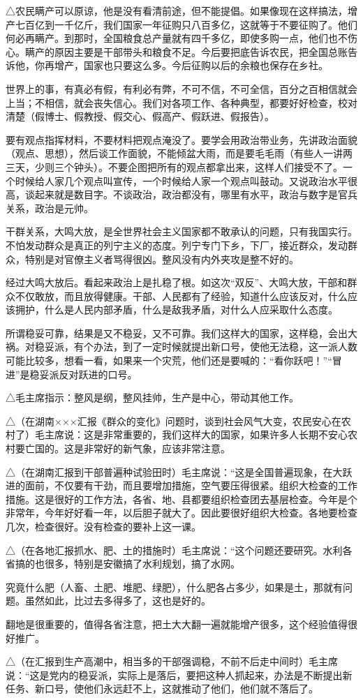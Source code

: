 △农民瞒产可以原谅，他是没有看清前途，但不能提倡。如果像现在这样搞法，增产七百亿到一千亿斤，我们国家一年征购只八百多亿，这就等于不要征购了。他们何必再瞒产。到那时，全国粮食总产量就有四千多亿，即使多购一点，他们也不伤心。瞒产的原因主要是干部带头和粮食不足。今后要把底告诉农民，把全国总账告诉他，你再增产，国家也只要这么多。今后征购以后的余粮也保存在乡社。

世界上的事，有真必有假，有利必有弊，不可不信，不可全信，百分之百相信就会上当；不相信，就会丧失信心。我们对各项工作、各种典型，都要好好检查，校对清楚（假博士、假教授、假交心、假高产、假跃进、假报告）。

要有观点指挥材料，不要材料把观点淹没了。要学会用政治带业务，先讲政治面貌（观点、思想），然后谈工作面貌，不能倾盆大雨，而是要毛毛雨（有些人一讲两三天，少则三个钟头）。不要企图把所有的观点都拿出来，这样人们接受不了。一个时候给人家几个观点叫宣传，一个时候给人家一个观点叫鼓动。又说政治水平很高，谈起来就是数目字。不谈政治，政治都没有，哪里有水平，政治与数字是官兵关系，政治是元帅。

干群关系，大鸣大放，是全世界社会主义国家都不敢承认的问题，只有我国实行。不怕发动群众是真正的列宁主义的态度。列宁专门下乡，下厂，接近群众，发动群众，特别是对官僚主义者骂得很凶。整风没有内外夹攻是整不好的。

经过大鸣大放后。看起来政治上是扎稳了根。如这次“双反”、大鸣大放，干部和群众不仅敢放，而且放得健康。干部、人民都有了经验，知道什么应该反对，什么应该拥护，什么是人民内部矛盾，什么是敌我矛盾，对什么人应采取什么态度。

所谓稳妥可靠，结果是又不稳妥，又不可靠。我们这样大的国家，这样稳，会出大祸。对稳妥派，有个办法，到了一定时候就提出新口号，使他无法稳，这一派人数可能比较多，想看一看，如果来一个灾荒，他们还是要喊的：“看你跃吧！”“冒进”是稳妥派反对跃进的口号。

△毛主席指示：整风是纲，整风挂帅，生产是中心，带动其他工作。

△（在湖南×××汇报《群众的变化》问题时，谈到社会风气大变，农民安心在农村了）毛主席说：这是非常重要的，我们这样大的国家，如果许多人长期不安心农村要亡国的。这是非常好的新气象，应该非常注意。

△（在湖南汇报到干部普遍种试验田时）毛主席说：“这是全国普遍现象，在大跃进的面前，不仅要有干劲，而且要增加措施，空气要压得很紧。组织大检查的工作措施。这是很好的工作方法，各省、地、县都要组织检查团去基层检查。今年是个非常年，今年好好看一年，以后胆子就大了。因此要很好组织大检查。各地要检查几次，检查很好。没有检查的要补上这一课。

△（在各地汇报抓水、肥、土的措施时）毛主席说：“这个问题还要研究。水利各省搞的也很多，特别是安徽搞了水利规划，搞了水网。

究竟什么肥（人畜、土肥、堆肥、绿肥），什么肥各占多少，如果是土，那就有问题。虽然如此，比过去多得多了，这也是好的。

翻地是很重要的，值得各省注意，把土大大翻一遍就能增产很多，这个经验值得很好推广。

△（在汇报到生产高潮中，相当多的干部强调稳，不前不后走中间时）毛主席说：“这是党内的稳妥派，实际上是落后，要把这种人抓起来，办法是不断提出新任务、新口号，使他们永远赶不上，这就推动了他们，他们就不落后了。


